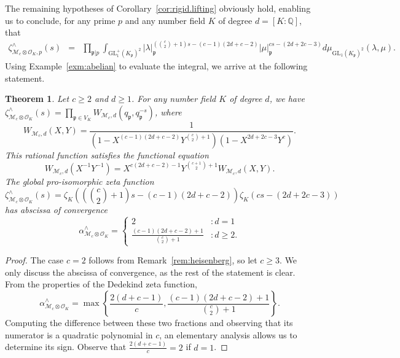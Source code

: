 \documentclass[11pt,a4paper]{amsart}
\theoremstyle{plain}
\newtheorem{thm}{Theorem}[section]
\theoremstyle{remark}
\newcommand{\Q}{\mathbb{Q}}
\newcommand{\tensor}{\otimes}
\newcommand{\p}{\mathfrak{p}}
\def \p {\ensuremath{\mathfrak{p}}}
\begin{document}
The remaining hypotheses of Corollary~\ref{cor:rigid.lifting} obviously hold, enabling us to conclude, for any prime $p$ and any number field $K$ of degree $d = [K : \Q]$, that
\begin{align*}
\zeta^\wedge_{\mathcal{M}_c \tensor \mathcal{O}_K, p} (s) & = 
& \prod_{\p | p} \int_{\mathrm{GL}^+_1(K_\p)^2} | \lambda |_{\p}^{\left( \binom{c}{2} + 1 \right) s - (c-1)(2d + c - 2)} |\mu|_{\p}^{cs - (2d + 2c - 3)} d \mu_{\mathrm{GL}_1(K_\p)^2} (\lambda, \mu).
\end{align*}
Using Example~\ref{exm:abelian} to evaluate the integral, we arrive at the following statement.
\begin{thm}
Let $c \geq 2$ and $d \geq 1$.  For any number field $K$ of degree $d$, we have $\zeta^\wedge_{\mathcal{M}_c \tensor \mathcal{O}_K}(s) = \prod_{\p \in V_K} W_{\mathcal{M}_c, d}(q_\p, q_\p^{-s})$, where
\begin{equation*}
W_{\mathcal{M}_c, d}(X,Y) = \frac{1}{( 1 - X^{(c-1)(2d + c - 2)} Y^{\binom{c}{2} + 1})(1 - X^{2d + 2c - 3}Y^c)}.
\end{equation*}
This rational function satisfies the functional equation
\begin{equation*}
W_{\mathcal{M}_c, d}(X^{-1} Y^{-1}) = X^{c(2d + c - 2) - 1} Y^{\binom{c+1}{2} + 1} W_{\mathcal{M}_c, d}(X,Y).
\end{equation*}
The global pro-isomorphic zeta function 
\begin{equation*}
\zeta^\wedge_{\mathcal{M}_c \tensor \mathcal{O}_K} (s) = \zeta_K \left( \left( \binom{c}{2} + 1 \right) s - (c-1)(2d + c - 2) \right) \zeta_{K} \left( cs - (2d + 2c - 3) \right)
\end{equation*}
has abscissa of convergence 
$$\alpha^\wedge_{\mathcal{M}_c \tensor \mathcal{O}_K} = 
\begin{cases}
2 &: d = 1 \\
\frac{(c-1)(2d + c - 2) + 1}{\binom{c}{2} + 1} &: d \geq 2.
\end{cases} 
$$
\end{thm}
\begin{proof}
The case $c = 2$ follows from Remark~\ref{rem:heisenberg}, so let $c \geq 3$.
We only discuss the abscissa of convergence, as the rest of the statement is clear.  From the properties of the Dedekind zeta function,
$$ \alpha^\wedge_{\mathcal{M}_c \tensor \mathcal{O}_K} = \max \left\{ \frac{2(d + c - 1)}{c}, \frac{(c-1)(2d + c - 2) + 1}{\binom{c}{2} + 1} \right\}.$$
Computing the difference between these two fractions and observing that its numerator is a quadratic polynomial in $c$, an elementary analysis allows us to determine its sign.  Observe that $\frac{2(d + c - 1)}{c} = 2$ if $d = 1$.
\end{proof}
\end{document}
